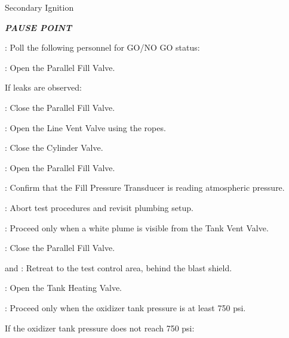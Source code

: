 \begin{checklist}
\begin{checklist}
        \item Secondary Ignition
    \end{checklist}
    \item \textbf{\textit{PAUSE POINT}}
    \item \ops{}: Poll the following personnel for GO/NO GO status:
    \begin{checklist}
        \item \peri{}
        \item \perii{}
        \item \heat
        \item \daq{}
        \item \primary{}
        \item \secondary
    \end{checklist}
    \item \primary{}: Open the Parallel Fill Valve.
    \begin{checklist}[label=$\bullet$]
        \item If leaks are observed:
        \begin{checklist}
            \item \primary{}: Close the Parallel Fill Valve.
            \item \primary{}: Open the Line Vent Valve using the ropes.
            \item \primary{}: Close the Cylinder Valve.
            \item \primary{}: Open the Parallel Fill Valve.
            \item \daq{}: Confirm that the Fill Pressure Transducer is reading atmospheric pressure.
            \item \ops{}: Abort test procedures and revisit plumbing setup.
        \end{checklist}
    \end{checklist}
    \item \secondary{}: Proceed only when a white plume is visible from the Tank Vent Valve.
    \item \primary{}: Close the Parallel Fill Valve.
    \item \primary{} and \secondary: Retreat to the test control area, behind the blast shield.
    \item \heat: Open the Tank Heating Valve.
    \item \daq{}: Proceed only when the oxidizer tank pressure is at least 750 psi.
    \begin{checklist}[label=$\bullet$]
        \item If the oxidizer tank pressure does not reach 750 psi:

\end{checklist}
\end{checklist}
